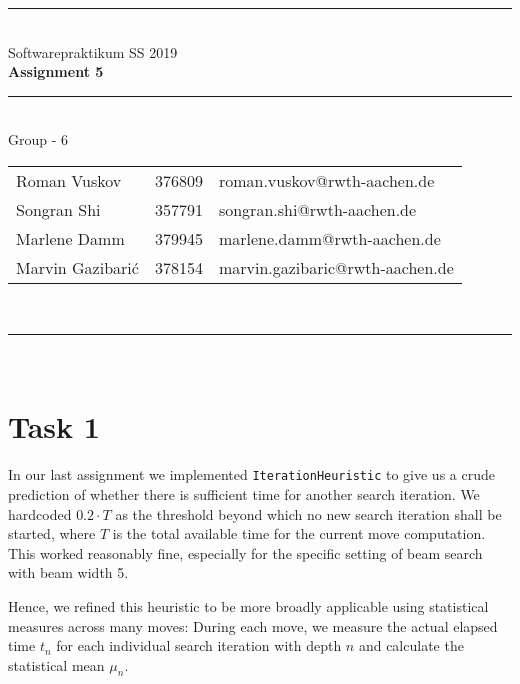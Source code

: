\documentclass[a4paper,12pt]{article}
\begin{document}
\begin{center}
	\rule{\textwidth}{0.1pt}\\[1cm]
	
	\Large Softwarepraktikum SS 2019\\\bf Assignment 5
\end{center}

\begin{center}

	\rule{\textwidth}{0.1pt}\\[0.5cm]

	{\Large Group - 6\\[5mm]}

	\begin{tabular}{lll}

		Roman Vuskov & 376809 & roman.vuskov@rwth-aachen.de \\

		Songran Shi & 357791 & songran.shi@rwth-aachen.de \\

		Marlene Damm & 379945 & marlene.damm@rwth-aachen.de \\
		
		Marvin Gazibarić & 378154 & marvin.gazibaric@rwth-aachen.de \\

	\end{tabular}\\[0.5cm]

	\rule{\textwidth}{0.1pt}\\[1cm]

\end{center}

\newpage

\section{Task 1}
In our last assignment we implemented \texttt{IterationHeuristic} to give us a crude prediction of whether there is sufficient time for another search iteration. We hardcoded $0.2 \cdot T$ as the threshold beyond which no new search iteration shall be started, where $T$ is the total available time for the current move computation. This worked reasonably fine, especially for the specific setting of beam search with beam width 5.

Hence, we refined this heuristic to be more broadly applicable using statistical measures across many moves: During each move, we measure the actual elapsed time $t_n$ for each individual search iteration with depth $n$ and calculate the statistical mean $\mu_n$.
\end{document}
